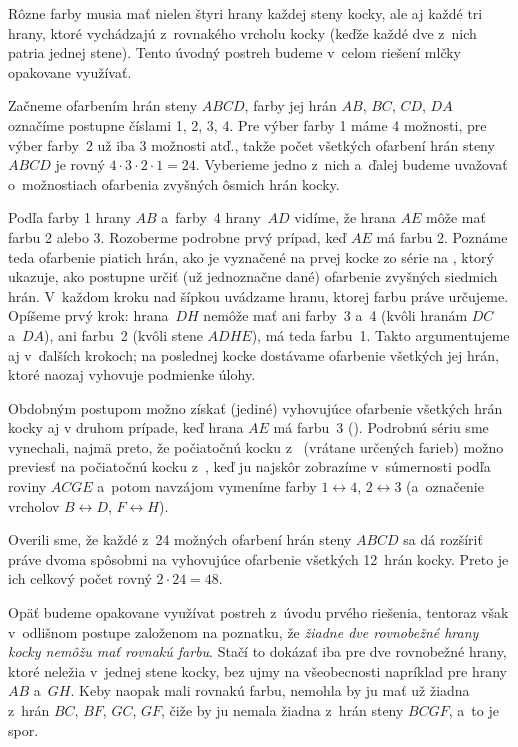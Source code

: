 {%
Rôzne farby musia mať nielen štyri hrany každej
steny kocky, ale aj každé tri hrany, ktoré vychádzajú z~rovnakého vrcholu kocky (keďže každé dve z~nich patria jednej stene).
Tento úvodný postreh budeme v~celom riešení mlčky opakovane
využívať.

Začneme ofarbením hrán steny $ABCD$,
farby jej hrán $AB$, $BC$, $CD$, $DA$ označíme postupne číslami
1, 2, 3, 4. Pre výber farby 1 máme 4 možnosti, pre výber farby~2
už iba 3 možnosti atď., takže počet všetkých ofarbení hrán steny $ABCD$
je rovný ${4\cdot3\cdot2\cdot1}=24$. Vyberieme jedno z~nich a~ďalej
budeme uvažovať o~možnostiach ofarbenia zvyšných ôsmich hrán kocky.

Podľa farby 1 hrany $AB$ a~farby~4 hrany~$AD$ vidíme, že hrana
$AE$ môže mať farbu 2 alebo 3. Rozoberme podrobne prvý prípad,
keď $AE$ má farbu 2. Poznáme teda ofarbenie piatich hrán, ako
je vyznačené na prvej kocke zo série na \obr,
%
ktorý ukazuje, ako
postupne určiť (už jednoznačne dané) ofarbenie zvyšných siedmich hrán.
V~každom kroku nad šípkou uvádzame hranu, ktorej farbu práve
určujeme. Opíšeme prvý krok: hrana~$DH$ nemôže mať ani farby~3
a~4 (kvôli hranám $DC$ a~$DA$), ani farbu~2 (kvôli stene $ADHE$),
má teda farbu~1. Takto argumentujeme aj v~ďalších krokoch;
na poslednej kocke dostávame ofarbenie všetkých jej hrán,
ktoré naozaj vyhovuje podmienke úlohy.

Obdobným postupom možno získať (jediné) vyhovujúce ofarbenie všetkých
hrán kocky aj v druhom prípade, keď hrana $AE$ má farbu~3
(\obr). Podrobnú sériu sme vynechali, najmä preto, že
počiatočnú kocku z~ (vrátane určených farieb) možno previesť na
počiatočnú kocku z~, keď ju najskôr zobrazíme
v~súmernosti podľa roviny $ACGE$ a~potom navzájom vymeníme farby
$1\leftrightarrow4$, $2\leftrightarrow3$ (a~označenie vrcholov
$B\leftrightarrow D$, $F\leftrightarrow H$).
%

Overili sme, že každé z~24 možných ofarbení hrán steny $ABCD$
sa dá rozšíriť práve dvoma spôsobmi na vyhovujúce ofarbenie všetkých
12~hrán kocky. Preto je ich celkový počet rovný $2\cdot24=48$.


\ineriesenie
Opäť budeme opakovane využívat postreh
z~úvodu prvého riešenia, tentoraz však v~odlišnom postupe
založenom na poznatku, že {\it žiadne dve
rovnobežné hrany kocky nemôžu mať rovnakú farbu}. Stačí to
dokázať iba pre dve rovnobežné hrany, ktoré neležia v~jednej stene
kocky, bez ujmy na všeobecnosti napríklad pre hrany $AB$
a~$GH$. Keby naopak mali rovnakú farbu,
nemohla by ju mať už žiadna z~hrán $BC$, $BF$, $GC$, $GF$,
čiže by ju nemala žiadna z~hrán steny $BCGF$, a~to je spor.

}
